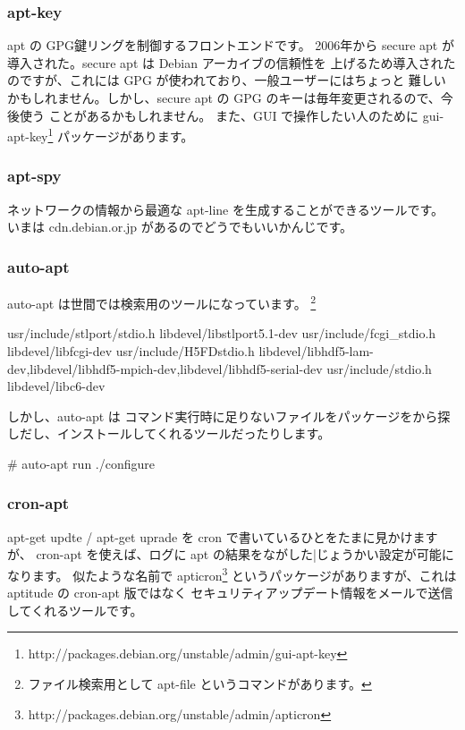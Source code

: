 \documentclass[mingoth,a4paper]{jsarticle}
\begin{document}

\subsubsection{apt-key}
 apt の GPG鍵リングを制御するフロントエンドです。
 2006年から secure apt が導入された。secure apt は Debian アーカイブの信頼性を
 上げるため導入されたのですが、これには GPG が使われており、一般ユーザーにはちょっと
 難しいかもしれません。しかし、secure apt の GPG のキーは毎年変更されるので、今後使う
 ことがあるかもしれません。
 また、GUI で操作したい人のために 
 gui-apt-key\footnote{http://packages.debian.org/unstable/admin/gui-apt-key} 
 パッケージがあります。
 
\subsubsection{apt-spy}
 ネットワークの情報から最適な apt-line を生成することができるツールです。
 いまは cdn.debian.or.jp があるのでどうでもいいかんじです。

\subsubsection{auto-apt}
 auto-apt は世間では検索用のツールになっています。
 \footnote{ファイル検索用として apt-file というコマンドがあります。}
 \begin{commandline}
 usr/include/stlport/stdio.h     libdevel/libstlport5.1-dev
 usr/include/fcgi_stdio.h        libdevel/libfcgi-dev
 usr/include/H5FDstdio.h libdevel/libhdf5-lam-dev,libdevel/libhdf5-mpich-dev,libdevel/libhdf5-serial-dev
 usr/include/stdio.h     libdevel/libc6-dev
 \end{commandline}
 しかし、auto-apt は コマンド実行時に足りないファイルをパッケージをから探しだし、インストールしてくれるツールだったりします。
 \begin{commandline}
 # auto-apt run ./configure
 \end{commandline}
 

\subsubsection{cron-apt}
 apt-get updte / apt-get uprade を cron で書いているひとをたまに見かけますが、
 cron-apt を使えば、ログに apt の結果をながした|じょうかい設定が可能になります。
 似たような名前で apticron\footnote{http://packages.debian.org/unstable/admin/apticron}
 というパッケージがありますが、これはaptitude の cron-apt 版ではなく 
 セキュリティアップデート情報をメールで送信してくれるツールです。
\end{document}
